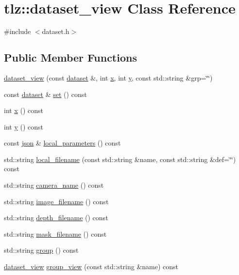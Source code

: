 \hypertarget{classtlz_1_1dataset__view}{}\section{tlz\+:\+:dataset\+\_\+view Class Reference}
\label{classtlz_1_1dataset__view}


{\ttfamily \#include $<$dataset.\+h$>$}

\subsection*{Public Member Functions}
\begin{DoxyCompactItemize}
\item 
\hyperlink{classtlz_1_1dataset__view_a31a73cf70078f270c9045bc0babadee2}{dataset\+\_\+view} (const \hyperlink{classtlz_1_1dataset}{dataset} \&, int \hyperlink{classtlz_1_1dataset__view_a00864b19071f222dc4c425c4bf2251ae}{x}, int \hyperlink{classtlz_1_1dataset__view_a78add0e028ef4b1bea46c9a68409dbe8}{y}, const std\+::string \&grp=\char`\"{}\char`\"{})
\item 
const \hyperlink{classtlz_1_1dataset}{dataset} \& \hyperlink{classtlz_1_1dataset__view_a13ceac1cdda5daa960ba25d5bd8802a4}{set} () const 
\item 
int \hyperlink{classtlz_1_1dataset__view_a00864b19071f222dc4c425c4bf2251ae}{x} () const 
\item 
int \hyperlink{classtlz_1_1dataset__view_a78add0e028ef4b1bea46c9a68409dbe8}{y} () const 
\item 
const \hyperlink{namespacetlz_ac400657dfcddf6309a769aefc23eed0c}{json} \& \hyperlink{classtlz_1_1dataset__view_a4951a6300847e0fed4fecf79d8753b58}{local\+\_\+parameters} () const 
\item 
std\+::string \hyperlink{classtlz_1_1dataset__view_a327a842dc304656596d65b9bbf52fb1c}{local\+\_\+filename} (const std\+::string \&name, const std\+::string \&def=\char`\"{}\char`\"{}) const 
\item 
std\+::string \hyperlink{classtlz_1_1dataset__view_a38cfd9cd54168855c54c607d01184c17}{camera\+\_\+name} () const 
\item 
std\+::string \hyperlink{classtlz_1_1dataset__view_af3c734eaed33af07993255db63d3fc54}{image\+\_\+filename} () const 
\item 
std\+::string \hyperlink{classtlz_1_1dataset__view_a63238745feff55e3d0bea101589895c1}{depth\+\_\+filename} () const 
\item 
std\+::string \hyperlink{classtlz_1_1dataset__view_adcb6370e1971f53a5dc49bbafed33725}{mask\+\_\+filename} () const 
\item 
std\+::string \hyperlink{classtlz_1_1dataset__view_a3bd68edab92df988a6b0c13d65b6bfca}{group} () const 
\item 
\hyperlink{classtlz_1_1dataset__view}{dataset\+\_\+view} \hyperlink{classtlz_1_1dataset__view_a1ec7ba844d313cddc558874fe85246a8}{group\+\_\+view} (const std\+::string \&name) const 
\end{DoxyCompactItemize}


